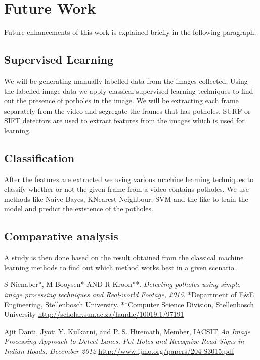 \documentclass[12pt,a4paper]{article}
\begin{document}
\section{Future Work}
Future enhancements of this work is explained briefly in the following paragraph.


\subsection{Supervised Learning}
We will be generating manually labelled data from the images collected. Using the labelled image data we apply classical supervised learning techniques to find out the presence of potholes in the image. We will be extracting each frame separately from the video and segregate the frames that has potholes. SURF or SIFT detectors are used to extract features from the images which is used for learning. 

\subsection{Classification}
After the features are extracted we using various machine learning techniques to classify whether or not the given frame from a video contains potholes. We use methods like Naive Bayes, KNearest Neighbour, SVM and the like to train the model and predict the existence of the potholes.


\subsection{Comparative analysis}
A study is then done based on the result obtained from the classical machine learning methods to find out which method works best in a given scenario.

\begin{thebibliography}{9}
S Nienaber*, M Booysen* AND R Kroon**.
\textit{Detecting potholes using simple image processing techniques and Real-world Footage, 2015}. 
*Department of E\&E Engineering, Stellenbosch University.
**Computer Science Division, Stellenbosch University
\url{http://scholar.sun.ac.za/handle/10019.1/97191}
 
Ajit Danti, Jyoti Y. Kulkarni, and P. S. Hiremath, Member, IACSIT
\textit{An Image Processing Approach to Detect Lanes, Pot Holes and Recognize Road Signs in Indian Roads, December 2012}
\url{http://www.ijmo.org/papers/204-S3015.pdf}
\end{thebibliography}
\end{document}
